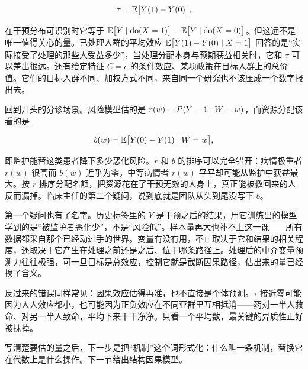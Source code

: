 \[
\tau=\mathbb{E}\bigl[Y(1)-Y(0)\bigr],
\]

在干预分布可识别时它等于 \(\mathbb{E}\bigl[Y\mid\operatorname{do}(X=1)\bigr]-\mathbb{E}\bigl[Y\mid\operatorname{do}(X=0)\bigr]\)。但这远不是唯一值得关心的量。已处理人群的平均效应 \(\mathbb{E}\bigl[Y(1)-Y(0)\mid X=1\bigr]\) 回答的是``实际接受了处理的那些人受益多少''，当处理分配本身与预期获益相关时，它和 \(\tau\) 可以差出很远。还有给定特征 \(C=c\) 的条件效应、某项政策在目标人群上的总价值。它们的目标人群不同、加权方式不同，来自同一个研究也不该压成一个数字报出去。

回到开头的分诊场景。风险模型估的是 \(r(w)=P(Y=1\mid W=w)\)，而资源分配该看的是

\[
b(w)=\mathbb{E}\bigl[Y(0)-Y(1)\mid W=w\bigr],
\]

即监护能替这类患者降下多少恶化风险。\(r\) 和 \(b\) 的排序可以完全错开：病情极重者 \(r(w)\) 很高而 \(b(w)\) 近乎为零，中等病情者 \(r(w)\) 平平却可能从监护中获益最大。按 \(r\) 排序分配名额，把资源花在了干预无效的人身上，真正能被救回来的人反而漏掉。临床主任的第二个疑问，说到底就是团队从头到尾没写下 \(b\)。

第一个疑问也有了名字。历史标签里的 \(Y\) 是干预之后的结果，用它训练出的模型学到的是``被监护者恶化少''，不是``风险低''。样本量再大也补不上这一课——所有数据都采自那个已经动过手的世界。变量有没有用，不止取决于它和结果的相关程度，还取决于它产生在处理之前还是之后、位于哪条路径上。处理后的中介变量预测力往往极强，可一旦目标是总效应，控制它就是截断因果路径，估出来的量已经换了含义。

反过来的错误同样常见：因果效应估得再准，也不直接是个体预测。\(\tau\) 接近零可能因为人人效应都小，也可能因为正负效应在不同亚群里互相抵消——药对一半人救命、对另一半人致命，平均下来干干净净。只看一个平均数，最关键的异质性正好被抹掉。

写清楚要估的量之后，下一步是把``机制''这个词形式化：什么叫一条机制，替换它在代数上是什么操作。下一节给出结构因果模型。
